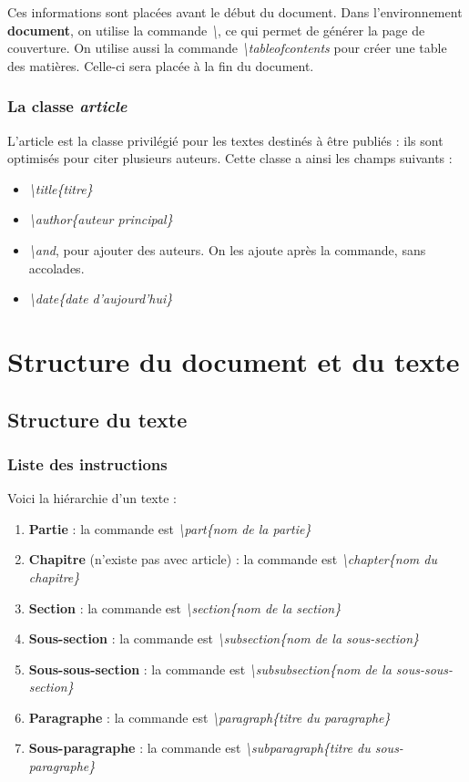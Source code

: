 \documentclass[a4paper, 10pt]{book}
\begin{document}
\pagebreak
Ces informations sont placées avant le début du document. 
Dans l'environnement \textbf{document}, on utilise la commande \textit{\textbackslash}, ce qui permet de générer la page de couverture.
On utilise aussi la commande \textit{\textbackslash tableofcontents} pour créer une table des matières. Celle-ci sera placée à la fin du document.

\subsection{La classe \textit{article}}

L'article est la classe privilégié pour les textes destinés à être publiés : ils sont optimisés pour citer plusieurs auteurs. Cette classe a ainsi les champs suivants :

\begin{itemize}
\item \textit{\textbackslash title\{titre\}}
\item \textit{\textbackslash author\{auteur principal\}}
\item \textit{\textbackslash and}, pour ajouter des auteurs. On les ajoute après la commande, sans accolades.
\item \textit{\textbackslash date\{date d'aujourd'hui\}}
\end{itemize}

\chapter{Structure du document et du texte}
\section{Structure du texte}
\subsection{Liste des instructions}
Voici la hiérarchie d'un texte : 

\begin{enumerate}
\item \textbf{Partie} : la commande est \textit{\textbackslash part\{nom de la partie\}}
\item \textbf{Chapitre} (n'existe pas avec article) : la commande est \textit{\textbackslash chapter\{nom du chapitre\}}
\item \textbf{Section} : la commande est \textit{\textbackslash section\{nom de la section\}}
\item \textbf{Sous-section} : la commande est \textit{\textbackslash subsection\{nom de la sous-section\}}
\item \textbf{Sous-sous-section} : la commande est \textit{\textbackslash subsubsection\{nom de la sous-sous-section\}}
\item \textbf{Paragraphe} : la commande est \textit{\textbackslash paragraph\{titre du paragraphe\}}
\item \textbf{Sous-paragraphe} : la commande est \textit{\textbackslash subparagraph\{titre du sous-paragraphe\}}
\end{enumerate}
\end{document}
